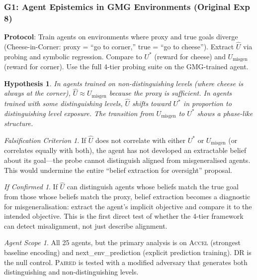 \documentclass[11pt,a4paper]{article}
\newtheorem{hypothesis}{Hypothesis}[subsection]
\theoremstyle{remark}
\newtheorem*{falsification}{Falsification Criterion}
\newtheorem*{implication}{If Confirmed}
\newtheorem*{agentscope}{Agent Scope}
\newcommand{\paired}{\textsc{Paired}}
\newcommand{\accel}{\textsc{Accel}}
\newcommand{\dr}{\textsc{DR}}
\newcommand{\Uhat}{\hat{U}}
\newcommand{\Ustar}{U^*}
\newcommand{\Umisgen}{U_{\text{misgen}}}
\begin{document}
\subsubsection{G1: Agent Epistemics in GMG Environments (Original Exp 8)}
\label{exp:gmg1}

\textbf{Protocol}: Train agents on environments where proxy and true goals diverge (Cheese-in-Corner: proxy = ``go to corner,'' true = ``go to cheese''). Extract $\Uhat$ via probing and symbolic regression. Compare to $\Ustar$ (reward for cheese) and $\Umisgen$ (reward for corner). Use the full 4-tier probing suite on the GMG-trained agent.

\begin{hypothesis}
In agents trained on non-distinguishing levels (where cheese is always at the corner), $\Uhat \approx \Umisgen$ because the proxy is sufficient. In agents trained with some distinguishing levels, $\Uhat$ shifts toward $\Ustar$ in proportion to distinguishing level exposure. The transition from $\Umisgen$ to $\Ustar$ shows a phase-like structure.
\end{hypothesis}

\begin{falsification}
If $\Uhat$ does not correlate with either $\Ustar$ or $\Umisgen$ (or correlates equally with both), the agent has not developed an extractable belief about its goal---the probe cannot distinguish aligned from misgeneralised agents. This would undermine the entire ``belief extraction for oversight'' proposal.
\end{falsification}

\begin{implication}
If $\Uhat$ can distinguish agents whose beliefs match the true goal from those whose beliefs match the proxy, belief extraction becomes a diagnostic for misgeneralisation: extract the agent's implicit objective and compare it to the intended objective. This is the first direct test of whether the 4-tier framework can detect misalignment, not just describe alignment.
\end{implication}

\begin{agentscope}
All 25 agents, but the primary analysis is on \accel{} (strongest baseline encoding) and next\_env\_prediction (explicit prediction training). \dr{} is the null control. \paired{} is tested with a modified adversary that generates both distinguishing and non-distinguishing levels.
\end{agentscope}
\end{document}
